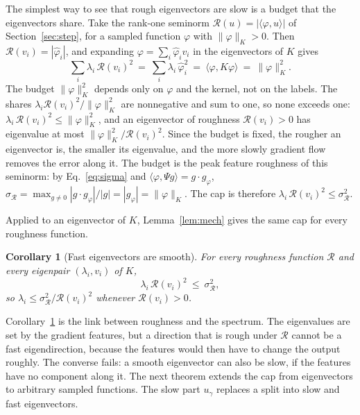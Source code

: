 \documentclass[11pt]{article}
\newtheorem{corollary}{Corollary}
\theoremstyle{definition}
\theoremstyle{remark}
\newcommand{\Rgh}{\mathcal{R}}           %
\newcommand{\sR}{\sigma_{\Rgh}}
\newcommand{\ip}[2]{\langle #1,#2\rangle}
\begin{document}
The simplest way to see that rough eigenvectors are slow is a budget that the eigenvectors share.
Take the rank-one seminorm $\Rgh(u) = |\ip{\varphi}{u}|$ of Section~\ref{sec:step}, for a sampled function $\varphi$ with $\|\varphi\|_K > 0$.
Then $\Rgh(v_i) = |\hat\varphi_i|$, and expanding $\varphi = \sum_i\hat\varphi_i v_i$ in the eigenvectors of $K$ gives
\begin{equation}\label{eq:budgetsum}
\sum_i\lambda_i\,\Rgh(v_i)^2 \ =\ \sum_i\lambda_i\,\hat\varphi_i^2 \ =\ \ip{\varphi}{K\varphi} \ =\ \|\varphi\|_K^2 .
\end{equation}
The budget $\|\varphi\|_K^2$ depends only on $\varphi$ and the kernel, not on the labels.
The shares $\lambda_i\Rgh(v_i)^2/\|\varphi\|_K^2$ are nonnegative and sum to one, so none exceeds one: $\lambda_i\,\Rgh(v_i)^2 \le \|\varphi\|_K^2$, and an eigenvector of roughness $\Rgh(v_i) > 0$ has eigenvalue at most $\|\varphi\|_K^2/\Rgh(v_i)^2$.
Since the budget is fixed, the rougher an eigenvector is, the smaller its eigenvalue, and the more slowly gradient flow removes the error along it.
The budget is the peak feature roughness of this seminorm: by Eq.~\eqref{eq:sigma} and $\ip{\varphi}{\Psi g} = g\cdot g_\varphi$, $\sR = \max_{g\neq 0}|g\cdot g_\varphi|/|g| = |g_\varphi| = \|\varphi\|_K$.
The cap is therefore $\lambda_i\,\Rgh(v_i)^2 \le \sR^2$.

Applied to an eigenvector of $K$, Lemma~\ref{lem:mech} gives the same cap for every roughness function.

\begin{corollary}[Fast eigenvectors are smooth]\label{cor:budget}
For every roughness function $\Rgh$ and every eigenpair $(\lambda_i, v_i)$ of $K$,
\begin{equation}\label{eq:budget}
\lambda_i\,\Rgh(v_i)^2 \ \le\ \sR^2 ,
\end{equation}
so $\lambda_i \le \sR^2/\Rgh(v_i)^2$ whenever $\Rgh(v_i) > 0$.
\end{corollary}

Corollary~\ref{cor:budget} is the link between roughness and the spectrum.
The eigenvalues are set by the gradient features, but a direction that is rough under $\Rgh$ cannot be a fast eigendirection, because the features would then have to change the output roughly.
The converse fails: a smooth eigenvector can also be slow, if the features have no component along it.
The next theorem extends the cap from eigenvectors to arbitrary sampled functions.
The slow part $u_\gamma$ replaces a split into slow and fast eigenvectors.
\end{document}

